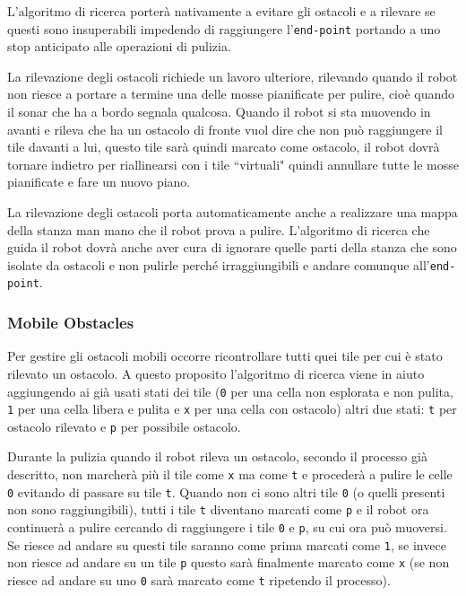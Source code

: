 L'algoritmo di ricerca porterà nativamente a evitare gli ostacoli e a rilevare se questi sono insuperabili impedendo di raggiungere l'\texttt{end-point} portando a uno stop anticipato alle operazioni di pulizia.

La rilevazione degli ostacoli richiede un lavoro ulteriore, rilevando quando il robot non riesce a portare a termine una delle mosse pianificate per pulire, cioè quando il sonar che ha a bordo segnala qualcosa. Quando il robot si sta muovendo in avanti e rileva che ha un ostacolo di fronte vuol dire che non può raggiungere il tile davanti a lui, questo tile sarà quindi marcato come ostacolo, il robot dovrà tornare indietro per riallinearsi con i tile ``virtuali" quindi annullare tutte le mosse pianificate e fare un nuovo piano. 

La rilevazione degli ostacoli porta automaticamente anche a realizzare una mappa della stanza man mano che il robot prova a pulire. L'algoritmo di ricerca che guida il robot dovrà anche aver cura di ignorare quelle parti della stanza che sono isolate da ostacoli e non pulirle perché irraggiungibili e andare comunque all'\texttt{end-point}.

\subsubsection{Mobile Obstacles}
Per gestire gli ostacoli mobili occorre ricontrollare tutti quei tile per cui è stato rilevato un ostacolo. A questo proposito l'algoritmo di ricerca viene in aiuto aggiungendo ai già usati stati dei tile (\texttt{0} per una cella non esplorata e non pulita, \texttt{1} per una cella libera e pulita e \texttt{x} per una cella con ostacolo) altri due stati: \texttt{t} per ostacolo rilevato e \texttt{p} per possibile ostacolo.

Durante la pulizia quando il robot rileva un ostacolo, secondo il processo già descritto, non marcherà più il tile come \texttt{x} ma come \texttt{t} e procederà a pulire le celle \texttt{0} evitando di passare su tile \texttt{t}. Quando non ci sono altri tile \texttt{0} (o quelli presenti non sono raggiungibili), tutti i tile \texttt{t} diventano marcati come \texttt{p} e il robot ora continuerà a pulire cercando di raggiungere i tile \texttt{0} e \texttt{p}, su cui ora può muoversi. Se riesce ad andare su questi tile saranno come prima marcati come \texttt{1}, se invece non riesce ad andare su un tile \texttt{p} questo sarà finalmente marcato come \texttt{x} (se non riesce ad andare su uno \texttt{0} sarà marcato come \texttt{t} ripetendo il processo).

